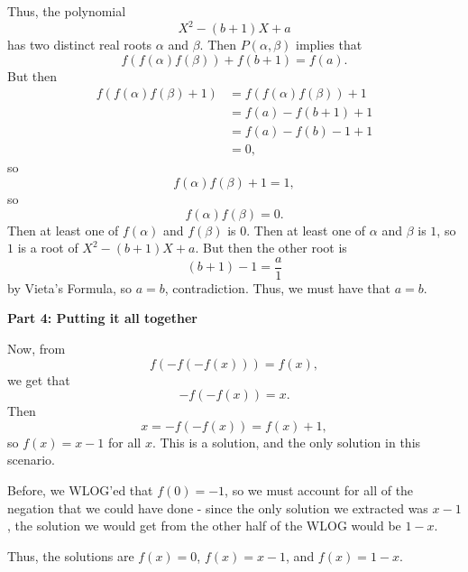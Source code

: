 Thus, the polynomial \[X^2-\left(b+1\right)X+a\] has two distinct real roots $\alpha$ and $\beta$. Then $P\left(\alpha,\beta\right)$ implies that \[f\left(f\left(\alpha\right)f\left(\beta\right)\right)+f\left(b+1\right)=f\left(a\right).\] But then \begin{align*}f\left(f\left(\alpha\right)f\left(\beta\right)+1\right)&=f\left(f\left(\alpha\right)f\left(\beta\right)\right)+1\\&=f\left(a\right)-f\left(b+1\right)+1\\&=f\left(a\right)-f\left(b\right)-1+1\\&=0,\end{align*} so \[f\left(\alpha\right)f\left(\beta\right)+1=1,\] so \[f\left(\alpha\right)f\left(\beta\right)=0.\] Then at least one of $f\left(\alpha\right)$ and $f\left(\beta\right)$ is $0$. Then at least one of $\alpha$ and $\beta$ is $1$, so $1$ is a root of $X^2-\left(b+1\right)X+a$. But then the other root is \[\left(b+1\right)-1=\frac{a}{1}\] by Vieta's Formula, so $a=b$, contradiction. Thus, we must have that $a=b$.

\textbf{Part 4: Putting it all together}

Now, from \[f\left(-f\left(-f\left(x\right)\right)\right)=f\left(x\right),\] we get that \[-f\left(-f\left(x\right)\right)=x.\] Then \[x=-f\left(-f\left(x\right)\right)=f\left(x\right)+1,\] so $f\left(x\right)=x-1$ for all $x$. This is a solution, and the only solution in this scenario.

Before, we WLOG'ed that $f\left(0\right)=-1$, so we must account for all of the negation that we could have done - since the only solution we extracted was $x-1$, the solution we would get from the other half of the WLOG would be $1-x$.

Thus, the solutions are $f\left(x\right)=\boxed{0}$, $f\left(x\right)=\boxed{x-1}$, and $f\left(x\right)=\boxed{1-x}$.
